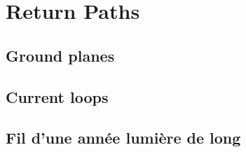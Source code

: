 
\section{Return Paths}
\subsection{Ground planes}

\subsection{Current loops}

\subsection{Fil d'une année lumière de long}
